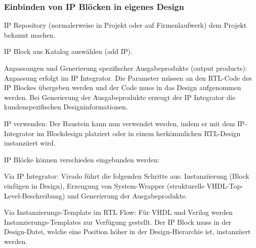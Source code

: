 \subsubsection{Einbinden von IP Blöcken in eigenes Design}
\begin{compactenum}
    \item IP Repository (normalerweise in Projekt oder auf Firmenlaufwerk) dem Projekt bekannt machen.
    \item IP Block aus Katalog auswählen (add IP).
    \item Anpassungen und Generierung spezifischer Ausgabeprodukte (output products): Anpassung erfolgt im IP Integrator. Die Parameter müssen an den RTL-Code des IP Blockes übergeben werden und der Code muss in das Design aufgenommen werden. Bei Generierung der Ausgabeprodukte erzeugt der IP Integrator die kundenspezifischen Designinformationen.
    \item IP verwenden: Der Baustein kann nun verwendet werden, indem er mit dem IP-Integrator im Blockdesign platziert oder in einem herkömmlichen RTL-Design instanziiert wird.
\end{compactenum}
IP Blöcke können verschieden eingebunden werden:
\begin{compactitem}
        \item Via IP Integrator: Vivado führt die folgenden Schritte aus: Instanziierung (Block einfügen in Design), Erzeugung von System-Wrapper (strukturelle VHDL-Top-Level-Beschreibung) und Generierung der Ausgabeprodukte.
        \item Via Instanzierungs-Template im RTL Flow: Für VHDL und Verilog werden Instanzierungs-Templates zur Verfügung gestellt. Der IP Block muss in der Design-Datei, welche eine Position höher in der Design-Hierarchie ist, instanziiert werden.
\end{compactitem}


